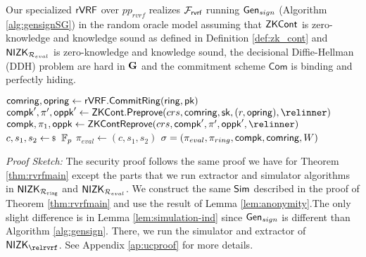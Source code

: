 \begin{theorem}\label{thm:rvrfspecial}
	Our specialized $ {\mathsf{rVRF}} $   over  $ pp_{rvrf} $ realizes $ \mathcal{F}_{\textsf{rvrf}} $ running $ \mathsf{Gen}_{sign} $ (Algorithm \ref{alg:gensignSG}) in the random oracle model assuming that ${\mathsf{ZKCont}} $ is zero-knowledge and knowledge sound as defined in Definition \ref{def:zk_cont} and $ {\mathsf{NIZK}}_{\mathcal{R}_{eval}} $ is zero-knowledge and knowledge sound, the decisional Diffie-Hellman (DDH) problem are hard in $ {\mathbf{G}}  $  and the commitment scheme $ \mathsf{Com} $ is binding and perfectly hiding. 
\end{theorem}
\begin{algorithm}
	\eprint{}{\scriptsize}
	\caption{$\Gen_{sign}(\ring,W,x = (\sk,r),\pk,\aux,\msg)$}
	\label{alg:gensignSG}	 	
	\begin{algorithmic}[1]
		\State $ \mathsf{comring}, \mathsf{opring} \leftarrow {\ensuremath{\mathsf{rVRF}}}.{\mathsf{CommitRing}}(\mathsf{ring}, \mathsf{pk}) $
		\State $ \compk', \pi', \openpk' \leftarrow \ZKCont.\Preprove(crs, \comring,\sk,(r,\openring),\relinner) $
		\State $ \compk, \pi_1, \openpk \leftarrow \ZKCont\Reprove(crs, \compk',\pi',\openpk',\relinner) $ 
		\State $ c,s_1, s_2 \leftsample \F_p $
		\State $ \pi_{eval}  \leftarrow (c,s_1, s_2)$		
		\State\Return$ \sigma = (\pi_{eval},\pi_{ring},\mathsf{compk},\mathsf{comring},W) $
	\end{algorithmic}
	
\end{algorithm}

\noindent \textit{Proof Sketch:}  The security proof follows the same proof we have for Theorem \ref{thm:rvrfmain} except the parts that we run extractor and simulator algorithms in $ {\mathsf{NIZK}}_{\mathcal{R}_{\mathtt{ring}}} $ and $ {\mathsf{NIZK}}_{\mathcal{R}_{eval}} $.
We construct the same $ \mathsf{Sim} $ described in the proof of Theorem \ref{thm:rvrfmain} and use the result of Lemma \ref{lem:anonymity}.The only slight difference is in Lemma \ref{lem:simulation-ind} since $ \mathsf{Gen}_{sign} $ is different than Algorithm \ref{alg:gensign}. There, we run the simulator and extractor of $ \NIZK_{\relrvrf} $. See Appendix \ref{ap:ucproof} for more details.



